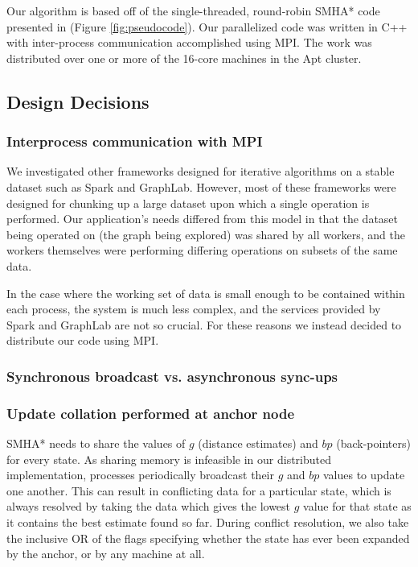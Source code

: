 \documentclass{article}
\begin{document}
Our algorithm is based off of the single-threaded, round-robin SMHA* code presented in \cite{Aine14} (Figure \ref{fig:pseudocode}). Our parallelized code was written in C++ with inter-process communication accomplished using MPI. The work was distributed over one or more of the 16-core machines in the Apt cluster. %

\subsection{Design Decisions}

\subsubsection*{Interprocess communication with MPI}

We investigated other frameworks designed for iterative algorithms on a stable dataset such as Spark and GraphLab. However, most of these frameworks were designed for chunking up a large dataset upon which a single operation is performed. Our application's needs differed from this model in that the dataset being operated on (the graph being explored) was shared by all workers, and the workers themselves were performing differing operations on subsets of the same data.

In the case where the working set of data is small enough to be contained within each process, the system is much less complex, and the services provided by Spark and GraphLab are not so crucial. For these reasons we instead decided to distribute our code using MPI.

\subsubsection*{Synchronous broadcast vs. asynchronous sync-ups}


\subsubsection*{Update collation performed at anchor node}

SMHA* needs to share the values of $g$ (distance estimates) and $bp$ (back-pointers) for every state. As sharing memory is infeasible in our distributed implementation, processes periodically broadcast their $g$ and $bp$ values to update one another. This can result in conflicting data for a particular state, which is always resolved by taking the data which gives the lowest $g$ value for that state as it contains the best estimate found so far. During conflict resolution, we also take the inclusive OR of the flags specifying whether the state has ever been expanded by the anchor, or by any machine at all.
\end{document}
